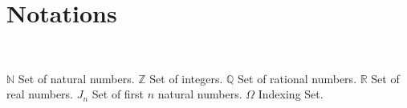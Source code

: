 \documentclass{tufte-book}
\theoremstyle{theorem}
\numberwithin{equation}{chapter}
\begin{document}
\chapter*{Notations}
\begin{fullwidth}
~\vfill
\vfill
\begin{doublespace}

	\noindent\fontsize{18}{22}\selectfont\itshape
	\nohyphenation

	 $\mathbb{N}$ \; Set of natural numbers. \newline
     $\mathbb{Z}$ \; Set of integers. \newline
     $\mathbb{Q}$ \; Set of rational numbers. \newline
     $\mathbb{R}$ \; Set of real numbers. \newline
     $J_n$ \; Set of first $n$ natural numbers. \newline
     $\Omega$ \; Indexing Set. \newline

\end{doublespace}
\vfill
\vfill
\end{fullwidth}

\mainmatter
 \pagecolor{white!40!yellow}

\pagecolor{white!40!yellow}


\backmatter




\end{document}
